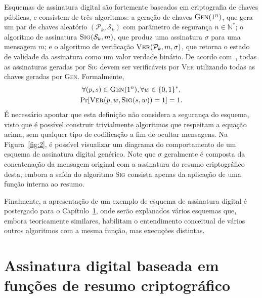 \documentclass{ufsctex/ufsctex}
\newcommand{\binwds}[1]{\{0, 1\}^{#1}}
\begin{document}
Esquemas de assinatura digital são fortemente baseados em criptografia de
chaves públicas, e consistem de três algoritmos: a geração de chaves
$\textsc{Gen}(1^n)$, que gera um par de chaves aleatório $(\mathcal{P}_k,
\mathcal{S}_k)$ com parâmetro de segurança $n \in \mathbb{N}^{*}$; o algoritmo
de assinatura $\textsc{Sig}(\mathcal{S}_k, m)$, que produz uma assinatura
$\sigma$ para uma mensagem $m$; e o algoritmo de verificação
$\textsc{Ver}(\mathcal{P}_k, m, \sigma)$, que retorna o estado de validade da
assinatura como um valor verdade binário. De acordo
com~\cite[Subseção 6.1.3]{Goldreich:book:2004}, todas as assinaturas
geradas por \textsc{Sig} devem ser verificáveis por \textsc{Ver} utilizando
todas as chaves geradas por \textsc{Gen}. Formalmente,
\begin{multline}
  \forall (p, s) \in \textsc{Gen}(1^n), \forall w \in \binwds{*}, \\
    \text{Pr}[\textsc{Ver}(p, w, \textsc{Sig}(s, w)) = 1] = 1.
\end{multline}
É necessário apontar que esta definição não considera a segurança do esquema,
visto que é possível construir trivialmente algoritmos que respeitam a equação
acima, sem qualquer tipo de codificação a fim de ocultar mensagens. Na
Figura~\ref{fig:2}, é possível visualizar um diagrama do comportamento de um
esquema de assinatura digital genérico. Note que $\sigma$ geralmente é composta
da concatenação da mensagem original com a assinatura do resumo criptográfico
desta, embora a saída do algoritmo \textsc{Sig} consista apenas da aplicação de
uma função interna ao resumo.

Finalmente, a apresentação de um exemplo de esquema de assinatura digital é
postergado para o Capítulo~\ref{chapter:hashsig}, onde serão explanados vários
esquemas que, embora teoricamente similares, habilitam o entendimento
conceitual de vários outros algoritmos com a mesma função, mas execuções
distintas.

\chapter{Assinatura digital baseada em
  funções de resumo criptográfico}\label{chapter:hashsig}
\end{document}
